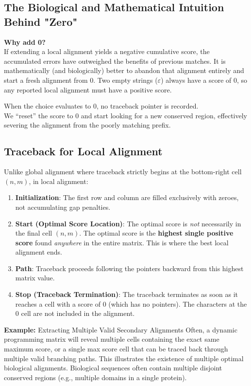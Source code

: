 \subsection{The Biological and Mathematical Intuition Behind "Zero"}
\sta \textbf{Why add 0?}\\
If extending a local alignment yields a negative cumulative score, the accumulated errors have outweighed the benefits of previous matches. It is mathematically (and biologically) better to abandon that alignment entirely and start a fresh alignment from 0. Two empty strings ($\varepsilon$) always have a score of 0, so any reported local alignment must have a positive score. 

When the choice evaluates to 0, no traceback pointer is recorded.\\\sta We ``reset'' the score to $0$ and start looking for a new conserved region, effectively severing the alignment from the poorly matching prefix. 

\subsection{Traceback for Local Alignment}
Unlike global alignment where traceback strictly begins at the bottom-right cell $(n,m)$, in local alignment:
\begin{enumerate}
    \item \textbf{Initialization}: The first row and column are filled exclusively with zeroes, not accumulating gap penalties.
    \item \textbf{Start (Optimal Score Location)}: The optimal score is \textit{not} necessarily in the final cell $(n,m)$. The optimal score is the \textbf{highest single positive score} found \textit{anywhere} in the entire matrix. This is where the best local alignment ends.
    \item \textbf{Path}: Traceback proceeds following the pointers backward from this highest matrix value.
    \item \textbf{Stop (Traceback Termination)}: The traceback terminates as soon as it reaches a cell with a score of 0 (which has no pointers). The characters at the 0 cell are not included in the alignment.
\end{enumerate}

\textbf{Example:} Extracting Multiple Valid Secondary Alignments
Often, a dynamic programming matrix will reveal multiple cells containing the exact same maximum score, or a single max score cell that can be traced back through multiple valid branching paths. This illustrates the existence of multiple optimal biological alignments. Biological sequences often contain multiple disjoint conserved regions (e.g., multiple domains in a single protein).

